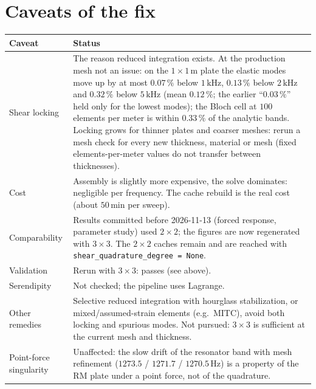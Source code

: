 \section{Caveats of the fix}

\begin{center}
\begin{tabular}{|p{}|p{}|}
\hline
Caveat & Status \\
\hline
Shear locking & The reason reduced integration exists. At the production mesh not an
issue: on the $1\times 1\,\mathrm{m}$ plate the elastic modes move up by at most
$0.07\,\%$ below $1\,\mathrm{kHz}$, $0.13\,\%$ below $2\,\mathrm{kHz}$ and $0.32\,\%$
below $5\,\mathrm{kHz}$ (mean $0.12\,\%$; the earlier ``$0.03\,\%$'' held only for the
lowest modes); the Bloch cell at $100$ elements per meter is within $0.33\,\%$ of the
analytic bands. Locking grows for
thinner plates and coarser meshes: rerun a mesh check for every new thickness,
material or mesh (fixed elements-per-meter values do not transfer between
thicknesses). \\
\hline
Cost & Assembly is slightly more expensive, the solve dominates: negligible per
frequency. The cache rebuild is the real cost (about $50\,\mathrm{min}$ per sweep). \\
\hline
Comparability & Results committed before 2026-11-13 (forced response, parameter
study) used $2\times 2$; the figures are now regenerated with $3\times 3$. The $2\times 2$
caches remain and are reached with \texttt{shear\_quadrature\_degree = None}. \\
\hline
Validation & Rerun with $3\times 3$: passes (see above). \\
\hline
Serendipity & Not checked; the pipeline uses Lagrange. \\
\hline
Other remedies & Selective reduced integration with hourglass stabilization, or
mixed/assumed-strain elements (e.g.\ MITC), avoid both locking and spurious modes.
Not pursued: $3\times 3$ is sufficient at the current mesh and thickness. \\
\hline
Point-force singularity & Unaffected: the slow drift of the resonator band with mesh
refinement ($1273.5$ / $1271.7$ / $1270.5\,\mathrm{Hz}$) is a property of the RM plate
under a point force, not of the quadrature. \\
\hline
\end{tabular}
\end{center}

